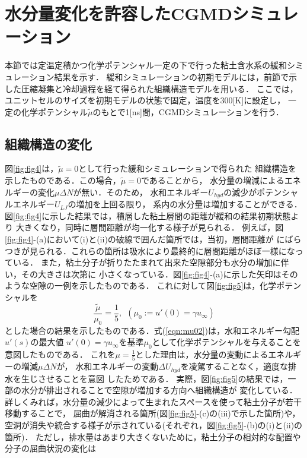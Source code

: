 \section{水分量変化を許容したCGMDシミュレーション}
本節では定温定積かつ化学ポテンシャル一定の下で行った粘土含水系の緩和シミュレーション結果を示す．
緩和シミュレーションの初期モデルには，前節で示した圧縮凝集と冷却過程を経て得られた組織構造モデルを用いる．
ここでは，ユニットセルのサイズを初期モデルの状態で固定，温度を300[K]に設定し，
一定の化学ポテンシャル$\tilde \mu$のもとで1[ns]間，CGMDシミュレーションを行う．
\subsection{組織構造の変化}
図\ref{fig:fig4}は，$\tilde \mu=0$として行った緩和シミュレーションで得られた
組織構造を示したものである．この場合，$\tilde \mu=0$であることから，
水分量の増減によるエネルギーの変化$\mu \Delta N$が無い．そのため，
水和エネルギー$U_{hyd}$の減少がポテンシャルエネルギー$U_{LJ}$の増加を上回る限り，
系内の水分量は増加することができる．
図\ref{fig:fig4}に示した結果では，積層した粘土層間の距離が緩和の結果初期状態より
大きくなり，同時に層間距離が均一化する様子が見られる．
例えば，図\ref{fig:fig4}-(a)において(i)と(ii)の破線で囲んだ箇所では，当初，層間距離が
にばらつきが見られる．これらの箇所は吸水により最終的に層間距離がほぼ一様になっている．
また，粘土分子が折りたたまれて出来た空隙部分も水分の増加に伴い，その大きさは次第に
小さくなっている．図\ref{fig:fig4}-(a)に示した矢印はそのような空隙の一例を示したものである．
%
これに対して図\ref{fig:fig5}は，化学ポテンシャルを
\begin{equation}
	\frac{\tilde \mu}{\mu _0}= \frac{1}{5}
	, \ \ 
	\left( 
		\mu_0:=u'(0)=\gamma u_\infty
	\right)
	\label{eqn:mu02}
\end{equation}
とした場合の結果を示したものである．式(\ref{eqn:mu02})は，水和エネルギー勾配$u'(s)$の最大値
$u'(0)=\gamma u_{\infty}$を基準$\mu_0$として化学ポテンシャルを与えることを意図したものである．
これを$\mu=\frac{1}{5}$とした理由は，水分量の変動によるエネルギーの増減$\mu \Delta N$が，
水和エネルギーの変動$\Delta U_{hyd}$を凌駕することなく，適度な排水を生じさせることを意図
したためである．
実際，図\ref{fig:fig5}の結果では，一部の水分が排出されることで空隙が増加する方向へ組織構造が
変化している．詳しくみれば，水分量の減少によって生まれたスペースを使って粘土分子が若干移動することで，
屈曲が解消される箇所(図\ref{fig:fig5}-(c)の(iii)で示した箇所)や，
空洞が消失や統合する様子が示されている(それぞれ，図\ref{fig:fig5}-(b)の(i)と(ii)の箇所)．
ただし，排水量はあまり大きくないために，粘土分子の相対的な配置や分子の屈曲状況の変化は
